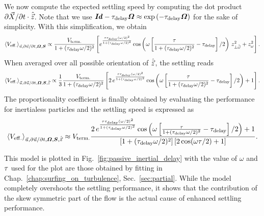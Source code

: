 We now compute the expected settling speed by computing the dot product $\partial \vec{X} / \partial t \cdot \hat{\vec{z}}$. 
Note that we use $\boldsymbol{\mathit{Id}} - \tau_{\mathrm{delay}} \boldsymbol{\varOmega} \approx \exp \left( -\tau_{\mathrm{delay}} \boldsymbol{\varOmega} \right)$ for the sake of simplicity.
With this simplification, we obtain
\begin{equation}
	\left\langle V_{\mathrm{eff.}} \right\rangle_{\vec{u}, \partial \vec{u} / \partial t, \boldsymbol{\varOmega}, \boldsymbol{S}} \propto \frac{V_{\mathrm{term.}}}{1 + (\tau_{\mathrm{delay}} \omega/2)^2} \left[e^{\frac{\tau \tau_{\mathrm{delay}} (\omega/2)^2}{1 + (\tau_{\mathrm{delay}} \omega/2)^2}} \cos \left(\omega \left[\frac{\tau}{1 + (\tau_{\mathrm{delay}} \omega / 2)^2} - \tau_{\mathrm{delay}} \right] / 2 \right) \, z_{\perp \hat{\vec{\omega}}}^2 + z_\omega^2 \right].
\end{equation}
When averaged over all possible orientation of $\hat{\vec{z}}$, the settling reads
\begin{equation}
	\left\langle V_{\mathrm{eff.}} \right\rangle_{\vec{u}, \partial \vec{u} / \partial t, \boldsymbol{\varOmega}, \boldsymbol{S}, \hat{\vec{z}}} \propto \frac{1}{3} \frac{V_{\mathrm{term.}}}{1 + (\tau_{\mathrm{delay}} \omega/2)^2} \left[ 2 \, e^{\frac{\tau \tau_{\mathrm{delay}} (\omega/2)^2}{1 + (\tau_{\mathrm{delay}} \omega/2)^2}} \cos \left(\omega \left[\frac{\tau}{1 + (\tau_{\mathrm{delay}} \omega / 2)^2} - \tau_{\mathrm{delay}} \right] / 2 \right) + 1 \right].
\end{equation}
The proportionality coefficient is finally obtained by evaluating the performance for inertialess particles and the settling speed is expressed as
\begin{equation}
	\left\langle V_{\mathrm{eff.}} \right\rangle_{\vec{u}, \partial \vec{u} / \partial t, \boldsymbol{\varOmega}, \boldsymbol{S}, \hat{\vec{z}}} \approx V_{\mathrm{term.}} \frac{2 \, e^{\frac{\tau \tau_{\mathrm{delay}} (\omega/2)^2}{1 + (\tau_{\mathrm{delay}} \omega/2)^2}} \cos \left(\omega \left[\frac{\tau}{1 + (\tau_{\mathrm{delay}} \omega / 2)^2} - \tau_{\mathrm{delay}} \right] / 2 \right) + 1}{\left[ 1 + (\tau_{\mathrm{delay}} \omega/2)^2 \right] \left[ 2 \cos(\omega \tau / 2) + 1 \right]}.
\end{equation}

This model is plotted in Fig.~\ref{fig:passive_inertial_delay} with the value of $\omega$ and $\tau$ used for the plot are those obtained by fitting in Chap.~\ref{chap:surfing_on_turbulence}, Sec.~\ref{sec:partial}.
While the model completely overshoots the settling performance, it shows that the contribution of the skew symmetric part of the flow is the actual cause of enhanced settling performance.

